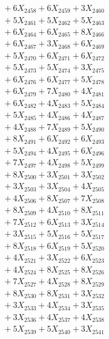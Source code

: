 \documentclass[a4paper,10pt]{article}
\begin{document}
{\begin{align}
&\;  + 6 X_{2458} + 6 X_{2459} + 3 X_{2460} \\[0.3ex]
&\;  + 5 X_{2461} + 5 X_{2462} + 5 X_{2463} \\[0.3ex]
&\;  + 6 X_{2464} + 6 X_{2465} + 8 X_{2466} \\[0.3ex]
&\;  + 6 X_{2467} + 3 X_{2468} + 6 X_{2469} \\[0.5ex]\allowbreak
&\;  + 5 X_{2470} + 6 X_{2471} + 6 X_{2472} \\[0.3ex]
&\;  + 5 X_{2473} + 5 X_{2474} + 3 X_{2475} \\[0.3ex]
&\;  + 6 X_{2476} + 6 X_{2477} + 5 X_{2478} \\[0.3ex]
&\;  + 6 X_{2479} + 7 X_{2480} + 4 X_{2481} \\[0.3ex]
&\;  + 6 X_{2482} + 4 X_{2483} + 5 X_{2484} \\[0.3ex]
&\;  + 5 X_{2485} + 4 X_{2486} + 4 X_{2487} \\[0.3ex]
&\;  + 4 X_{2488} + 7 X_{2489} + 5 X_{2490} \\[0.3ex]
&\;  + 8 X_{2491} + 6 X_{2492} + 6 X_{2493} \\[0.3ex]
&\;  + 5 X_{2494} + 4 X_{2495} + 6 X_{2496} \\[0.3ex]
&\;  + 7 X_{2497} + 4 X_{2498} + 5 X_{2499} \\[0.5ex]\allowbreak
&\;  + 8 X_{2500} + 3 X_{2501} + 3 X_{2502} \\[0.3ex]
&\;  + 3 X_{2503} + 3 X_{2504} + 4 X_{2505} \\[0.3ex]
&\;  + 4 X_{2506} + 8 X_{2507} + 7 X_{2508} \\[0.3ex]
&\;  + 8 X_{2509} + 4 X_{2510} + 8 X_{2511} \\[0.3ex]
&\;  + 7 X_{2512} + 6 X_{2513} + 3 X_{2514} \\[0.3ex]
&\;  + 3 X_{2515} + 5 X_{2516} + 5 X_{2517} \\[0.3ex]
&\;  + 8 X_{2518} + 6 X_{2519} + 5 X_{2520} \\[0.3ex]
&\;  + 4 X_{2521} + 3 X_{2522} + 6 X_{2523} \\[0.3ex]
&\;  + 4 X_{2524} + 8 X_{2525} + 8 X_{2526} \\[0.3ex]
&\;  + 7 X_{2527} + 4 X_{2528} + 8 X_{2529} \\[0.5ex]\allowbreak
&\;  + 8 X_{2530} + 8 X_{2531} + 3 X_{2532} \\[0.3ex]
&\;  + 3 X_{2533} + 4 X_{2534} + 3 X_{2535} \\[0.3ex]
&\;  + 3 X_{2536} + 4 X_{2537} + 4 X_{2538} \\[0.3ex]
&\;  + 5 X_{2539} + 5 X_{2540} + 3 X_{2541} \\[0.3ex]

\end{align}}
\end{document}
